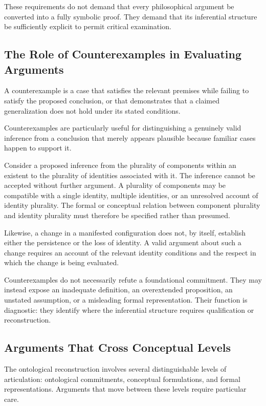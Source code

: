 These requirements do not demand that every philosophical argument
be converted into a fully symbolic proof. They demand that its
inferential structure be sufficiently explicit to permit critical
examination.

\subsection{The Role of Counterexamples in Evaluating Arguments}

A counterexample is a case that satisfies the relevant premises
while failing to satisfy the proposed conclusion, or that
demonstrates that a claimed generalization does not hold under
its stated conditions.

Counterexamples are particularly useful for distinguishing
a genuinely valid inference from a conclusion that merely appears
plausible because familiar cases happen to support it.

Consider a proposed inference from the plurality of components
within an existent to the plurality of identities associated
with it. The inference cannot be accepted without further
argument. A plurality of components may be compatible with a
single identity, multiple identities, or an unresolved account
of identity plurality. The formal or conceptual relation between
component plurality and identity plurality must therefore be
specified rather than presumed.

Likewise, a change in a manifested configuration does not, by
itself, establish either the persistence or the loss of identity.
A valid argument about such a change requires an account of the
relevant identity conditions and the respect in which the change
is being evaluated.

Counterexamples do not necessarily refute a foundational
commitment. They may instead expose an inadequate definition,
an overextended proposition, an unstated assumption, or a
misleading formal representation. Their function is diagnostic:
they identify where the inferential structure requires
qualification or reconstruction.

\subsection{Arguments That Cross Conceptual Levels}

The ontological reconstruction involves several distinguishable
levels of articulation: ontological commitments, conceptual
formulations, and formal representations. Arguments that move
between these levels require particular care.

